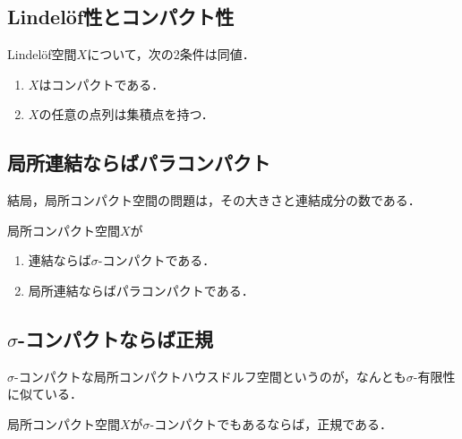 \documentclass[uplatex,dvipdfmx]{jsreport}
\begin{document}
\subsection{Lindelöf性とコンパクト性}

\begin{proposition}
    Lindelöf空間$X$について，次の2条件は同値．
    \begin{enumerate}
        \item $X$はコンパクトである．
        \item $X$の任意の点列は集積点を持つ．
    \end{enumerate}
\end{proposition}

\subsection{局所連結ならばパラコンパクト}

\begin{tcolorbox}[colframe=ForestGreen, colback=ForestGreen!10!white,breakable,colbacktitle=ForestGreen!40!white,coltitle=black,fonttitle=\bfseries\sffamily,
title=]
    結局，局所コンパクト空間の問題は，その大きさと連結成分の数である．
\end{tcolorbox}

\begin{proposition}
    局所コンパクト空間$X$が
    \begin{enumerate}
        \item 連結ならば$\sigma$-コンパクトである．
        \item 局所連結ならばパラコンパクトである．
    \end{enumerate}
\end{proposition}

\subsection{$\sigma$-コンパクトならば正規}

\begin{tcolorbox}[colframe=ForestGreen, colback=ForestGreen!10!white,breakable,colbacktitle=ForestGreen!40!white,coltitle=black,fonttitle=\bfseries\sffamily,
title=]
    $\sigma$-コンパクトな局所コンパクトハウスドルフ空間というのが，なんとも$\sigma$-有限性に似ている．
\end{tcolorbox}

\begin{proposition}
    局所コンパクト空間$X$が$\sigma$-コンパクトでもあるならば，正規である．
\end{proposition}
\end{document}
